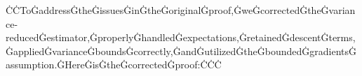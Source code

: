 ĊĊToĠaddressĠtheĠissuesĠinĠtheĠoriginalĠproof,ĠweĠcorrectedĠtheĠvariance-reducedĠestimator,ĠproperlyĠhandledĠexpectations,ĠretainedĠdescentĠterms,ĠappliedĠvarianceĠboundsĠcorrectly,ĠandĠutilizedĠtheĠboundedĠgradientsĠassumption.ĠHereĠisĠtheĠcorrectedĠproof:ĊĊĊ%